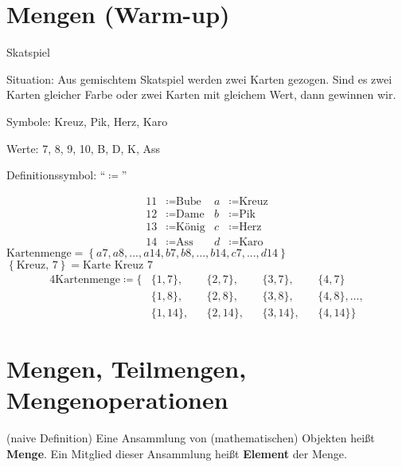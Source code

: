 \documentclass[a4paper, markcase = upper, parskip = true, fleqn]{scrartcl}
\begin{document}
\section{Mengen (Warm-up)}
Skatspiel\par
Situation: Aus gemischtem Skatspiel werden zwei Karten gezogen. Sind es zwei Karten gleicher Farbe oder zwei Karten mit gleichem Wert, dann gewinnen wir.\par
Symbole: Kreuz, Pik, Herz, Karo\par
Werte: 7, 8, 9, 10, B, D, K, Ass\par
Definitionssymbol: ``$\coloneqq$''\par
\begin{examplebox}
	\begin{align*}
		11 &\coloneqq \text{Bube}	& a &\coloneqq \text{Kreuz}\\
		12 &\coloneqq \text{Dame}	& b &\coloneqq \text{Pik}\\
		13 &\coloneqq \text{König}	& c &\coloneqq \text{Herz}\\
		14 &\coloneqq \text{Ass}	& d &\coloneqq \text{Karo}
	\end{align*}
	$\text{Kartenmenge} = \left\{a7, a8, ..., a14, b7, b8, ..., b14, c7, ..., d14\right\}$\\
	$\left\{\text{Kreuz, 7}\right\} = \text{Karte Kreuz 7}$
	\begin{alignat*}{4}
		\text{Kartenmenge} \coloneqq \{	&\{1, 7\}, &&\{2, 7\}, &&\{3, 7\}, &&\{4, 7\}\\
		~				&\{1, 8\}, &&\{2, 8\}, &&\{3, 8\}, &&\{4, 8\}, ...,\\
		~				&\{1, 14\}, &&\{2, 14\}, &&\{3, 14\}, &&\{4, 14\}\}
	\end{alignat*}
\end{examplebox}



\section{Mengen, Teilmengen, Mengenoperationen}

\begin{definitionbox}
	(naive Definition) Eine Ansammlung von (mathematischen) Objekten heißt \textbf{Menge}. Ein Mitglied dieser Ansammlung heißt \textbf{Element} der Menge.
\end{definitionbox}
\end{document}
